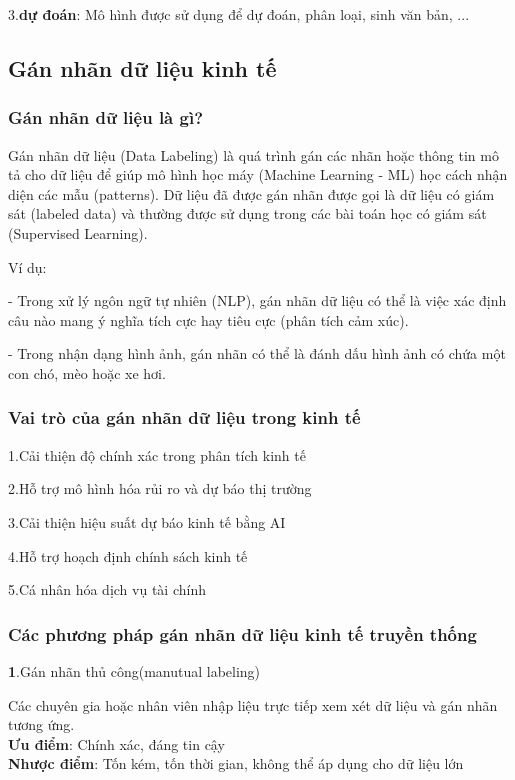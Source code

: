 \documentclass{article} %
\begin{document}
\hspace{35pt} 3.\textbf{dự đoán}: Mô hình được sử dụng để dự đoán, phân loại, sinh văn bản, ...

\subsection{Gán nhãn dữ liệu kinh tế} 

\subsubsection{Gán nhãn dữ liệu là gì?}
Gán nhãn dữ liệu (Data Labeling) là quá trình gán các nhãn hoặc thông tin mô tả cho dữ liệu để giúp mô hình 
học máy (Machine Learning - ML) học cách nhận diện các mẫu (patterns). Dữ liệu đã được gán nhãn được gọi là dữ liệu 
có giám sát (labeled data) và thường được sử dụng trong các bài toán học có giám sát (Supervised Learning).

Ví dụ: 

\hspace{10pt}- Trong xử lý ngôn ngữ tự nhiên (NLP), gán nhãn dữ liệu có thể là việc xác định câu nào mang ý nghĩa tích cực hay tiêu cực (phân tích cảm xúc).

\hspace{10pt}- Trong nhận dạng hình ảnh, gán nhãn có thể là đánh dấu hình ảnh có chứa một con chó, mèo hoặc xe hơi.

\subsubsection{Vai trò của gán nhãn dữ liệu trong kinh tế}
\hspace{10pt} 1.Cải thiện độ chính xác trong phân tích kinh tế

2.Hỗ trợ mô hình hóa rủi ro và dự báo thị trường

3.Cải thiện hiệu suất dự báo kinh tế bằng AI

4.Hỗ trợ hoạch định chính sách kinh tế

5.Cá nhân hóa dịch vụ tài chính

\subsubsection{Các phương pháp gán nhãn dữ liệu kinh tế truyền thống}

\textbf{1}.Gán nhãn thủ công(manutual labeling)

\hspace{10pt} Các chuyên gia hoặc nhân viên nhập liệu trực tiếp xem xét dữ liệu và gán nhãn tương ứng.\\
\textbf{Ưu điểm}: Chính xác, đáng tin cậy\\
\textbf{Nhược điểm}: Tốn kém, tốn thời gian, không thể áp dụng cho dữ liệu lớn
\end{document}
